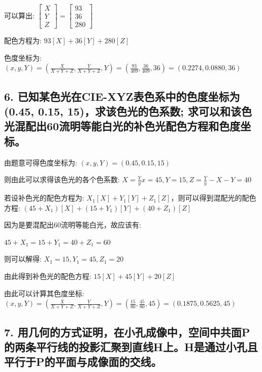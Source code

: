 \documentclass[]{article}
\begin{document}
可以算出:
\(\begin{bmatrix}X \\ Y \\ Z\end{bmatrix}=\begin{bmatrix}93 \\ 36 \\ 280 \end{bmatrix}\)

配色方程为: \(93[X]+36[Y]+280[Z]\)

色度坐标为:
\((x,y,Y)=(\frac{X}{X+Y+Z},\frac{Y}{X+Y+Z},Y)=(\frac{93}{409},\frac{36}{409},36)=(0.2274,0.0880,36)\)

\hypertarget{header-n5}{%
\subsection{6. 已知某色光在CIE-XYZ表色系中的色度坐标为(0.45, 0.15, 15)，求该色光的色系数; 求可以和该色光混配出60流明等能白光的补色光配色方程和色度坐标。}\label{header-n5}}

由题意可得色度坐标为: \((x,y,Y)=(0.45,0.15,15)\)

则由此可以求得该色光的各个色系数:
\(X=\frac{Y}{y}x=45,Y=15,Z=\frac{Y}{y}-X-Y=40\)

若设补色光的配色方程为:
\(X_1[X]+Y_1[Y]+Z_1[Z]\)，则可以得到混配光的配色方程:
\((45+X_1)[X]+(15+Y_1)[Y]+(40+Z_1)[Z]\)

因为是要混配出60流明等能白光，故应该有:

\(45+X_1=15+Y_1=40+Z_1=60\)

则可以解得: \(X_1=15,Y_1=45,Z_1=20\)

由此得到补色光的配色方程: \(15[X]+45[Y]+20[Z]\)

由此可以计算其色度坐标:
\((x,y,Y)=(\frac{X}{X+Y+Z},\frac{Y}{X+Y+Z},Y)=(\frac{15}{80},\frac{45}{80},45)=(0.1875,0.5625,45)\)

\hypertarget{header-n7}{%
\subsection{7. 用几何的方式证明，在小孔成像中，空间中共面P的两条平行线的投影汇聚到直线H上。H是通过小孔且平行于P的平面与成像面的交线。}\label{header-n7}}
\end{document}
